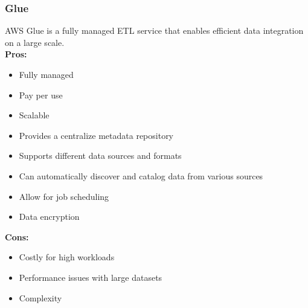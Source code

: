         \subsubsection{Glue}
        \label{aws:glue}
        AWS Glue is a fully managed ETL service that enables efficient data integration on a large scale.\\
        \textbf{Pros:}
        \begin{itemize}
            \item Fully managed
            \item Pay per use
            \item Scalable
            \item Provides a centralize metadata repository
            \item Supports different data sources and formats
            \item Can automatically discover and catalog data from various sources
            \item Allow for job scheduling
            \item Data encryption
        \end{itemize}
        \textbf{Cons:}
        \begin{itemize}
            \item Costly for high workloads
            \item Performance issues with large datasets
            \item Complexity
        \end{itemize}

